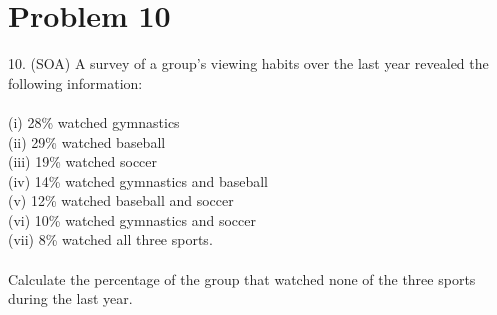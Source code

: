 \documentclass{article}
\begin{document}
	\section*{Problem 10} 

	10. (SOA) A survey of a group’s viewing habits over the last year revealed the following
information: \\\\
(i) 28\% watched gymnastics\\
(ii) 29\% watched baseball\\
(iii) 19\% watched soccer\\
(iv) 14\% watched gymnastics and baseball\\
(v) 12\% watched baseball and soccer\\
(vi) 10\% watched gymnastics and soccer\\
(vii) 8\% watched all three sports.\\\\
Calculate the percentage of the group that watched none of the three sports during the last year.
\end{document}
